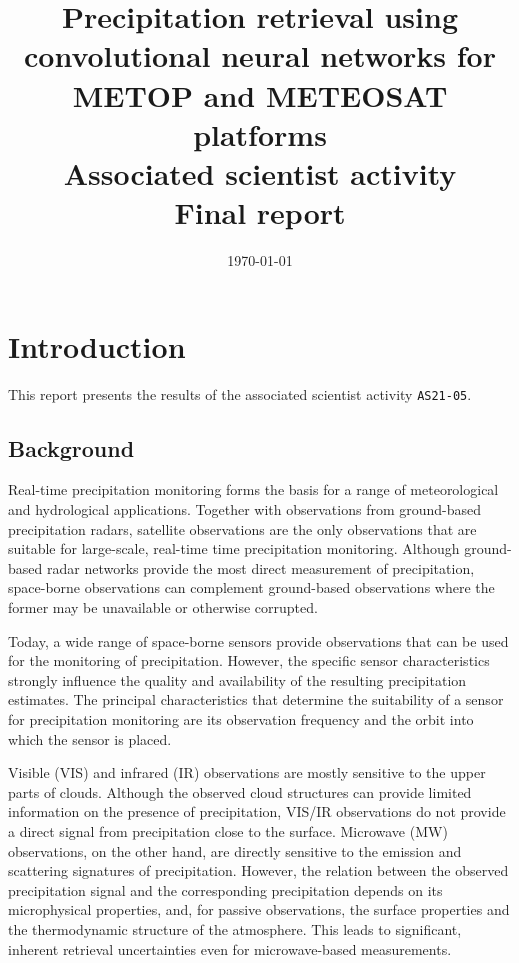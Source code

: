 \documentclass[11pt]{scrartcl}
\date{\today}
\title{Precipitation retrieval using convolutional neural networks for METOP and METEOSAT platforms\\\medskip
\large Associated scientist activity \\ Final report}
\begin{document}
\maketitle


\section{Introduction}
\label{sec:org8b2f08a}

This report presents the results of the associated scientist activity \texttt{AS21-05}. 


\subsection{Background}
\label{sec:orgc337a7d}

Real-time precipitation monitoring forms the basis for a range of meteorological
and hydrological applications. Together with observations from ground-based
precipitation radars, satellite observations are the only observations that are
suitable for large-scale, real-time time precipitation monitoring. Although
ground-based radar networks provide the most direct measurement of precipitation,
space-borne observations can complement ground-based observations where the
former may be unavailable or otherwise corrupted.

Today, a wide range of space-borne sensors provide observations that can be used
for the monitoring of precipitation. However, the specific sensor characteristics
strongly influence the quality and availability of the resulting precipitation
estimates. The principal characteristics that determine the suitability of a
sensor for precipitation monitoring are its observation frequency and the orbit
into which the sensor is placed.

Visible (VIS) and infrared (IR) observations are mostly sensitive to the upper
parts of clouds. Although the observed cloud structures can provide limited
information on the presence of precipitation, VIS/IR observations  do not
provide a direct signal from precipitation close to the surface. Microwave
(MW) observations, on the other hand, are directly sensitive to the emission and
scattering signatures of precipitation. However, the relation between the
observed precipitation signal and the corresponding precipitation depends on its
microphysical properties, and, for passive observations, the surface properties
and the thermodynamic structure of the atmosphere. This leads to significant,
inherent retrieval uncertainties even for microwave-based measurements.
\end{document}
